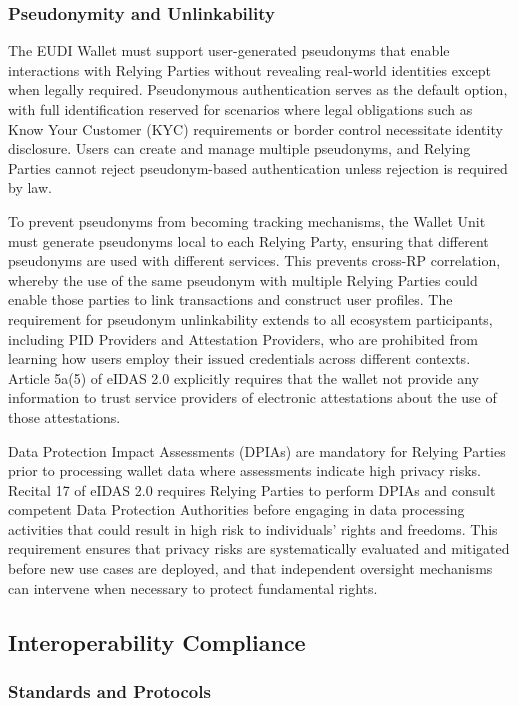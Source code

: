 \documentclass[sigconf,balance,nonacm,authordraft]{acmart}
\begin{document}
\subsubsection{Pseudonymity and Unlinkability}

The EUDI Wallet must support user-generated pseudonyms that enable interactions with Relying Parties without revealing real-world identities except when legally required. Pseudonymous authentication serves as the default option, with full identification reserved for scenarios where legal obligations such as Know Your Customer (KYC) requirements or border control necessitate identity disclosure. Users can create and manage multiple pseudonyms, and Relying Parties cannot reject pseudonym-based authentication unless rejection is required by law.

To prevent pseudonyms from becoming tracking mechanisms, the Wallet Unit must generate pseudonyms local to each Relying Party, ensuring that different pseudonyms are used with different services. This prevents cross-RP correlation, whereby the use of the same pseudonym with multiple Relying Parties could enable those parties to link transactions and construct user profiles. The requirement for pseudonym unlinkability extends to all ecosystem participants, including PID Providers and Attestation Providers, who are prohibited from learning how users employ their issued credentials across different contexts. Article 5a(5) of eIDAS 2.0 explicitly requires that the wallet not provide any information to trust service providers of electronic attestations about the use of those attestations.

Data Protection Impact Assessments (DPIAs) are mandatory for Relying Parties prior to processing wallet data where assessments indicate high privacy risks. Recital 17 of eIDAS 2.0 requires Relying Parties to perform DPIAs and consult competent Data Protection Authorities before engaging in data processing activities that could result in high risk to individuals' rights and freedoms. This requirement ensures that privacy risks are systematically evaluated and mitigated before new use cases are deployed, and that independent oversight mechanisms can intervene when necessary to protect fundamental rights.

\subsection{Interoperability Compliance}

\subsubsection{Standards and Protocols}
\end{document}
